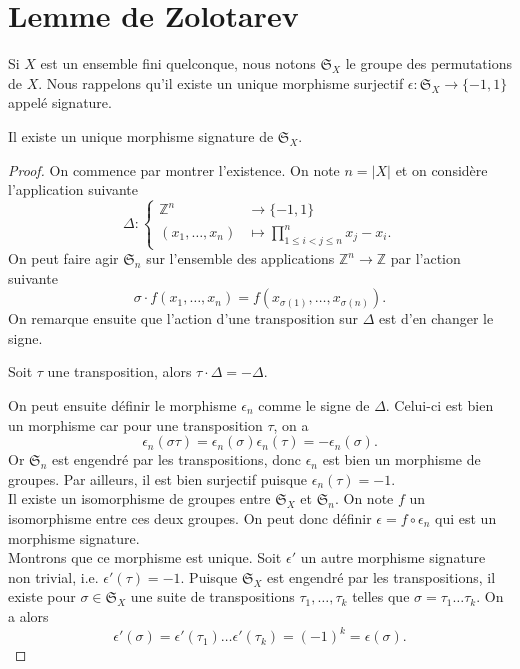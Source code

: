 \documentclass[../main.tex]{subfiles}
\begin{document}
\section{Lemme de Zolotarev}
Si \(X\) est un ensemble fini quelconque, nous notons \(\mathfrak{S}_X\) le groupe des permutations de \(X\).
Nous rappelons qu'il existe un unique morphisme surjectif \(\epsilon : \mathfrak{S}_X \longrightarrow \{-1,1\}\)
appelé signature. 
\begin{theorem} Il existe un unique morphisme signature de \(\mathfrak{S}_X\).
\end{theorem}
\begin{proof}
    On commence par montrer l'existence. On note \(n = \lvert X \rvert\) et on considère l'application suivante
    \begin{equation}
        \Delta : \begin{cases}
            \mathbb{Z}^n & \longrightarrow \{-1,1\}\\
            (x_1,\ldots,x_n) & \longmapsto \prod_{1\le i<j \le n}^n x_j -x_i.
        \end{cases}
    \end{equation}
    On peut faire agir \(\mathfrak{S}_n\) sur l'ensemble des applications \(\mathbb{Z}^n\to \mathbb{Z}\) par l'action suivante
    \begin{equation}
        \sigma \cdot f (x_1, \ldots, x_n) = f(x_{\sigma(1)},\ldots, x_{\sigma(n)}).
    \end{equation}
    On remarque ensuite que l'action d'une transposition sur \(\Delta\) est d'en changer le signe.
    \begin{lemma}
        Soit \(\tau\) une transposition, alors \(\tau \cdot \Delta = -\Delta\).
    \end{lemma}
    On peut ensuite définir le morphisme \(\epsilon_n\) comme le signe de \(\Delta\).
    Celui-ci est bien un morphisme car pour une transposition \(\tau\), on a 
    \begin{equation}
        \epsilon_n(\sigma\tau) = \epsilon_n(\sigma)\epsilon_n(\tau) = -\epsilon_n(\sigma).
    \end{equation}
    Or \(\mathfrak{S}_n\) est engendré par les transpositions, donc \(\epsilon_n\) est bien un morphisme de groupes.
    Par ailleurs, il est bien surjectif puisque \(\epsilon_n(\tau) = -1\).
    \\
    Il existe un isomorphisme de groupes entre \(\mathfrak{S}_X\) et \(\mathfrak{S}_n\). On note \(f\) un isomorphisme entre ces deux groupes.
    On peut donc définir \(\epsilon = f\circ \epsilon_n\) qui est un morphisme signature.
    \\

    Montrons que ce morphisme est unique. Soit \(\epsilon'\) un autre morphisme signature non trivial, i.e. \(\epsilon'(\tau) = -1\).
    Puisque \(\mathfrak{S}_X\) est engendré par les transpositions, il existe pour \(\sigma\in \mathfrak{S}_X\) une suite de transpositions \(\tau_1,\ldots, \tau_k\) telles que \(\sigma = \tau_1\ldots \tau_k\).
    On a alors
    \begin{equation}
        \epsilon'(\sigma) = \epsilon'(\tau_1)\ldots \epsilon'(\tau_k) = (-1)^k = \epsilon(\sigma).
    \end{equation}
\end{proof}
\end{document}
